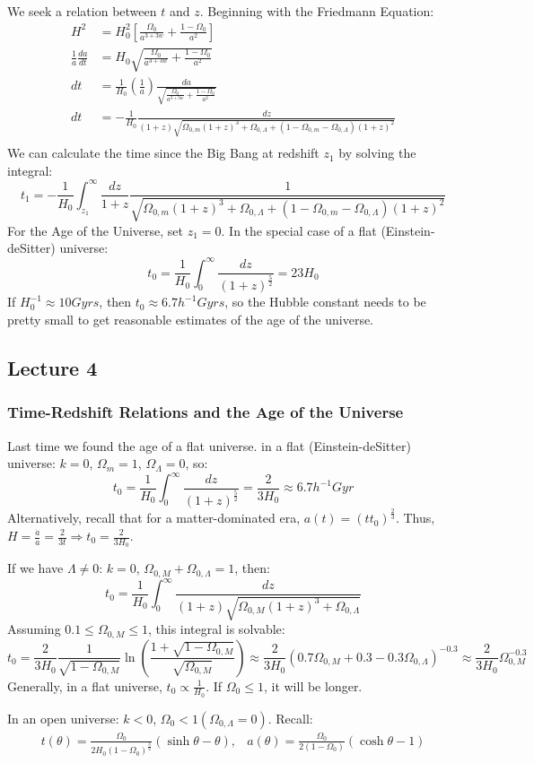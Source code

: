 \documentclass{article}
\def\imply{\Rightarrow}
\def\inv#1{\frac{1}{ #1}}
\def\aa{\frac{\dot a }{ a}}
\def\etot{\Omega_0}
\def\econs{\Omega_{0,\Lambda}}
\def\emat{\Omega_{0,M}}
\def\econs{\Omega_{0,\Lambda}}
\def\attw{a^{3+3w}}
\def\imply{\Rightarrow}
\def\etot{\Omega_0}
\def\econs{\Omega_{0,\Lambda}}
\def\emat{\Omega_{0,M}}
\def\econs{\Omega_{0,\Lambda}}
\def\attw{a^{3+3w}}
\def\jumble{\frac{\Omega _0}{ \attw} + \frac{1 - \Omega _0}{ a^2}}
\def\jimble{\sqrt{\Omega _{0,m}(1+z)^3+\Omega _{0,\Lambda}+(1-\Omega _{0,m}-\Omega _{0,\Lambda})(1+z)^2}}
\begin{document}
We seek a relation between $t$ and $z$.  Beginning with the Friedmann Equation:
\begin{align}
H^2&=H_0^2\left[\jumble\right]\\
\inv{a}\frac{da}{ dt}&=H_0\sqrt{\jumble}\\
dt&=\inv{H_0}\left(\inv{a}\right)\frac{da}{\sqrt{\jumble}}\\
dt&=-\inv{H_0}\frac{dz }{ (1+z)\jimble}\\
\end{align}
We can calculate the time since the Big Bang at redshift $z_1$ by solving the
integral:
$$t_1=-\inv{H_0}\int_{z_1}^\infty{\frac{dz}{ 1+z}\inv{\jimble}}$$
For the Age of the Universe, set $z_1=0$.  In the special case of a flat
(Einstein-deSitter) universe: 
$$t_0=\inv{H_0}\int_0^\infty\frac{dz}{(1+z)^\frac{5}{ 2}}={2}{3H_0}$$  
If $H_0^{-1}\approx10Gyrs$,
then $t_0\approx6.7h^{-1}Gyrs$, so the Hubble constant needs to be pretty
small to get reasonable estimates of the age of the universe.



\subsection{Lecture 4}

\subsubsection{ Time-Redshift Relations and the Age of the Universe }

Last time we found the age of a flat universe.
in a flat (Einstein-deSitter) universe: 
$k=0$, $\Omega_m=1$, $\Omega_\Lambda=0$, so:
$$t_0=\inv{H_0}\int_0^\infty{\frac{dz}{(1+z)^\frac{5}{ 2}}}
=\frac{2}{3H_0}\approx6.7h^{-1}Gyr$$
Alternatively, recall that for a matter-dominated era,
$a(t) = ({t}{ t_0})^\frac{2}{ 3}.$
Thus, $H = \aa = \frac{2}{ 3t} \imply t_0=\frac{2}{ 3H_0}$.

If we have $\Lambda\ne0$: $k=0$, $\emat+\econs=1$, then:
$$t_0=\inv{H_0}\int_0^\infty\frac{dz}{(1+z)\sqrt{\emat(1+z)^3+\econs}}$$
Assuming $0.1\le\emat\le1$, this integral is solvable:
$$t_0=\frac{2}{3H_0}\inv{\sqrt{1-\emat}}\ln\left(\frac{1+\sqrt{1-\emat}}{
\sqrt{\emat}}\right)\approx\frac{2}{3H_0}(0.7\emat+0.3-0.3\econs)^{-0.3}
\approx\frac{2}{3H_0}\emat^{-0.3}$$
Generally, in a flat universe, $t_0\propto\inv{H_0}$.  If $\Omega_0\le1$, 
it will be longer.

In an open universe: $k<0$, $\etot<1(\econs=0)$. Recall:
$$\begin{matrix} t(\theta)=\frac{\etot}{2H_0(1-\etot)^\frac{3}{2}}(\sinh\theta-\theta),&
a(\theta)=\frac{\etot}{2(1-\etot)}(\cosh\theta-1)\end{matrix}$$
\end{document}
